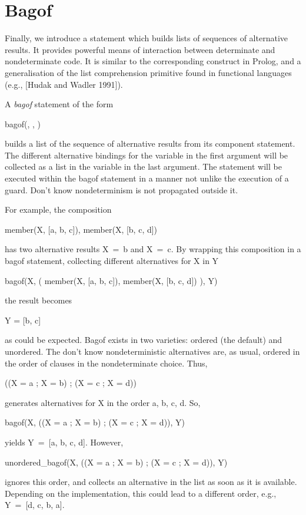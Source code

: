 \section{Bagof}

Finally, we introduce a statement which builds lists of sequences of
alternative results.  It provides powerful means of interaction between
determinate and nondeterminate code.  It is similar to the
corresponding construct in Prolog, and a generalisation of the list
comprehension primitive found in functional languages (e.g., [Hudak
and Wadler 1991]).

A {\em bagof} statement of the form
%
\begin{progex}
bagof(, , )
\end{progex}%
%
builds a list of the sequence of alternative results from its
component statement.  The different alternative bindings for the
variable in the first argument will be collected as a list in the
variable in the last argument.  The statement will be executed within
the bagof statement in a manner not unlike the execution of a
guard.  Don't know nondeterminism is not propagated outside it.

For example, the composition
%
\begin{progex}
member(X, [a, b, c]), member(X, [b, c, d])
\end{progex}%
%
has two alternative results {\prog X~=~b} and {\prog X~=~c}.  By
wrapping this composition in a bagof statement, collecting different
alternatives for {\prog X} in {\prog Y}
%
\begin{progex}
bagof(X, ( member(X, [a, b, c]), member(X, [b, c, d]) ), Y)
\end{progex}%
%
the result becomes
%
\begin{progex}
Y = [b, c]
\end{progex}%
%
as could be expected.  Bagof exists in two varieties: ordered (the
default) and unordered.  The don't know nondeterministic alternatives
are, as usual, ordered in the order of clauses in the nondeterminate
choice.  Thus,
%
\begin{progex}
((X = a ; X = b) ; (X = c ; X = d))
\end{progex}%
%
generates alternatives for X in the order a, b, c, d.  So,
%
\begin{progex}
bagof(X, ((X = a ; X = b) ; (X = c ; X = d)), Y)
\end{progex}%
%
yields {\prog Y~=~[a, b, c, d]}.  However,
%
\begin{progex}
unordered_bagof(X, ((X = a ; X = b) ; (X = c ; X = d)), Y)
\end{progex}%
%
ignores this order, and collects an alternative in the list as soon as
it is available.  Depending on the implementation, this could lead to
a different order, e.g., {\prog Y~=~[d, c, b, a]}.

